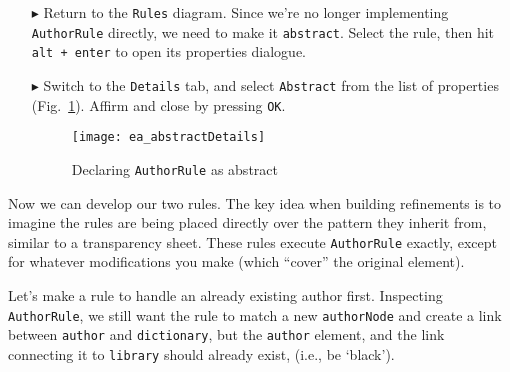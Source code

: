 \begin{itemize}

\item[$\blacktriangleright$] Return to the \texttt{Rules} diagram. Since we're no longer implementing \texttt{AuthorRule} directly, we need to make it
\texttt{abstract}. Select the rule, then hit \texttt{alt + enter} to open its properties dialogue.

\item[$\blacktriangleright$] Switch to the \texttt{Details} tab, and select \texttt{Abstract} from the list of properties (Fig.~\ref{ea:abstractDetails}). 
Affirm and close by pressing \texttt{OK}.

\begin{figure}[htbp]
\begin{center}
  \texttt{[image: ea\_abstractDetails]}
  \caption{Declaring \texttt{AuthorRule} as abstract}
  \label{ea:abstractDetails}
\end{center}
\end{figure}

\end{itemize}

Now we can develop our two rules. The key idea when building refinements is to imagine the rules are being placed directly over the pattern they inherit from,
similar to a transparency sheet. These rules execute \texttt{AuthorRule} exactly, except for whatever modifications you make (which ``cover'' the original
element).

Let's make a rule to handle an already existing author first. Inspecting \texttt{AuthorRule}, we still want the rule to match a new \texttt{authorNode}
and create a link between \texttt{author} and \texttt{dictionary}, but the \texttt{author} element, and the link connecting it to \texttt{library} should
already exist, (i.e., be `black').


